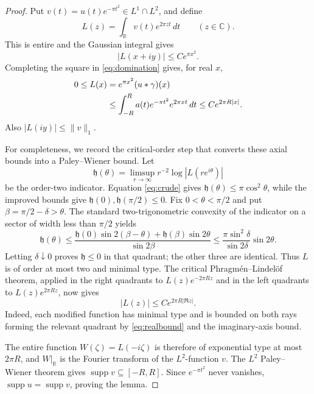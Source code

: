 \documentclass[10pt]{article}
\newcommand{\R}{\mathbb R}
\newcommand{\supp}{\operatorname{supp}}
\begin{document}
\begin{proof}
Put \(v(t)=u(t)e^{-\pi t^2}\in L^1\cap L^2\), and define
\[
 L(z)=\int_\R v(t)e^{2\pi zt}\,dt\qquad(z\in\mathbb C).
\]
This is entire and the Gaussian integral gives
\begin{equation}\label{eq:crude}
             |L(x+iy)|\le C e^{\pi x^2}.
\end{equation}
Completing the square in \eqref{eq:domination} gives, for real \(x\),
\begin{align}
 0\le L(x)
 &=e^{\pi x^2}(u*\gamma)(x)\notag\\
 &\le\int_{-R}^{R}a(t)e^{-\pi t^2}e^{2\pi xt}\,dt
 \le C e^{2\pi R|x|}.                                      \label{eq:realbound}
\end{align}
Also \(|L(iy)|\le\|v\|_1\).

For completeness, we record the critical-order step that converts these
axial bounds into a Paley--Wiener bound.  Let
\[
 \mathfrak h(\theta)=\limsup_{r\to\infty}
 r^{-2}\log|L(re^{i\theta})|
\]
be the order-two indicator.  Equation \eqref{eq:crude} gives
\(\mathfrak h(\theta)\le\pi\cos^2\theta\), while the improved bounds give
\(\mathfrak h(0),\mathfrak h(\pi/2)\le0\).  Fix
\(0<\theta<\pi/2\) and put \(\beta=\pi/2-\delta>\theta\).  The standard
two-trigonometric convexity of the indicator on a sector of width less than
\(\pi/2\) yields
\[
 \mathfrak h(\theta)
 \le\frac{\mathfrak h(0)\sin2(\beta-\theta)
          +\mathfrak h(\beta)\sin2\theta}{\sin2\beta}
 \le\frac{\pi\sin^2\delta}{\sin2\delta}\sin2\theta.
\]
Letting \(\delta\downarrow0\) proves \(\mathfrak h\le0\) in that quadrant;
the other three are identical.  Thus \(L\) is of order at most two and
minimal type.  The critical Phragm\'en--Lindel\"of theorem, applied in the
right quadrants to \(L(z)e^{-2\pi Rz}\) and in the left quadrants to
\(L(z)e^{2\pi Rz}\), now gives
\begin{equation}\label{eq:type}
                     |L(z)|\le C e^{2\pi R|\Re z|}.
\end{equation}
Indeed, each modified function has minimal type and is bounded on both rays
forming the relevant quadrant by \eqref{eq:realbound} and the imaginary-axis
bound.

The entire function \(W(\zeta)=L(-i\zeta)\) is therefore of exponential
type at most \(2\pi R\), and \(W|_\R\) is the Fourier transform of the
\(L^2\)-function \(v\).  The \(L^2\) Paley--Wiener theorem gives
\(\supp v\subseteq[-R,R]\).  Since \(e^{-\pi t^2}\) never vanishes,
\(\supp u=\supp v\), proving the lemma.
\end{proof}
\end{document}
